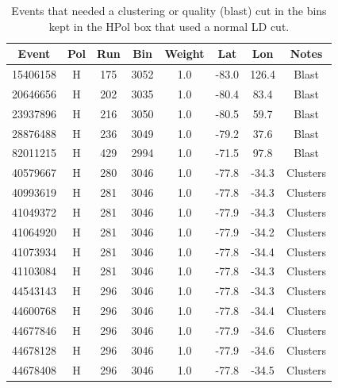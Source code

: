 \begin{table}
\centering
\begin{tabular}{ |c|c|c|c|c|c|c|c| } 
\hline

Event & Pol & Run & Bin & Weight & Lat & Lon & Notes \\
\hline
15406158 & H & 175 & 3052 & 1.0 & -83.0 & 126.4 & {\color{red} Blast} \\
20646656 & H & 202 & 3035 & 1.0 & -80.4 & 83.4 & {\color{red} Blast} \\
23937896 & H & 216 & 3050 & 1.0 & -80.5 & 59.7 & {\color{red} Blast} \\
28876488 & H & 236 & 3049 & 1.0 & -79.2 & 37.6 & {\color{red} Blast} \\
82011215 & H & 429 & 2994 & 1.0 & -71.5 & 97.8 & {\color{red} Blast} \\
40579667 & H & 280 & 3046 & 1.0 & -77.8 & -34.3 & Clusters \\
40993619 & H & 281 & 3046 & 1.0 & -77.8 & -34.3 & Clusters \\
41049372 & H & 281 & 3046 & 1.0 & -77.9 & -34.3 & Clusters \\
41064920 & H & 281 & 3046 & 1.0 & -77.9 & -34.2 & Clusters \\
41073934 & H & 281 & 3046 & 1.0 & -77.8 & -34.4 & Clusters \\
41103084 & H & 281 & 3046 & 1.0 & -77.8 & -34.3 & Clusters \\
44543143 & H & 296 & 3046 & 1.0 & -77.8 & -34.3 & Clusters \\ 
44600768 & H & 296 & 3046 & 1.0 & -77.8 & -34.4 & Clusters \\
44677846 & H & 296 & 3046 & 1.0 & -77.9 & -34.6 & Clusters \\
44678128 & H & 296 & 3046 & 1.0 & -77.9 & -34.6 & Clusters \\ 
44678408 & H & 296 & 3046 & 1.0 & -77.8 & -34.5 & Clusters \\

\hline
\end{tabular}
\caption{Events that needed a clustering or quality (blast) cut in the bins kept in the HPol box that used a normal LD cut.}
\label{normal_hpol_bins}
\end{table}

